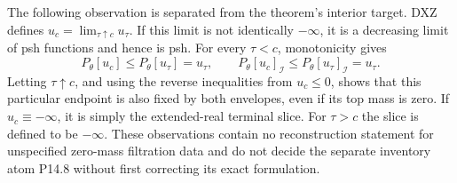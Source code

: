 The following observation is separated from the theorem's interior target.
DXZ defines \(u_c=\lim_{\tau\uparrow c}u_\tau\).
If this limit is not identically \(-\infty\), it is a decreasing limit of
psh functions and hence is psh.
For every \(\tau<c\), monotonicity gives
\[
 P_\theta[u_c]\leq P_\theta[u_\tau]=u_\tau,\qquad
 P_\theta[u_c]_{\mathcal I}\leq
                          P_\theta[u_\tau]_{\mathcal I}=u_\tau.
\]
Letting \(\tau\uparrow c\), and using the reverse inequalities from
\(u_c\leq0\), shows that this particular endpoint is also fixed by both
envelopes, even if its top mass is zero.
If \(u_c\equiv-\infty\), it is simply the extended-real terminal slice.
For \(\tau>c\) the slice is defined to be \(-\infty\).
These observations contain no reconstruction statement for unspecified
zero-mass filtration data and do not decide the separate inventory atom
P14.8 without first correcting its exact formulation.
